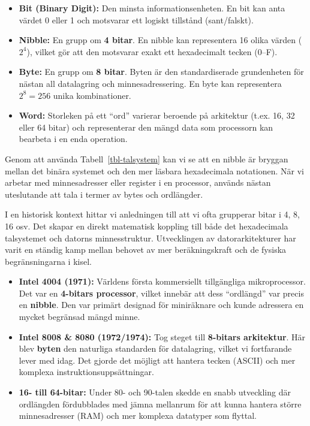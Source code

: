 \documentclass[
  swedish,
  letterpaper,
  oneside,
  openany]{book}
\providecommand{\tightlist}{%
  \setlength{\itemsep}{0pt}\setlength{\parskip}{0pt}}
\begin{document}
\begin{itemize}
\tightlist
\item
  \textbf{Bit (Binary Digit):} Den minsta informationsenheten. En bit
  kan anta värdet 0 eller 1 och motsvarar ett logiskt tillstånd
  (sant/falskt).
\item
  \textbf{Nibble:} En grupp om \textbf{4 bitar}. En nibble kan
  representera 16 olika värden (\(2^4\)), vilket gör att den motsvarar
  exakt ett hexadecimalt tecken (0--F).
\item
  \textbf{Byte:} En grupp om \textbf{8 bitar}. Byten är den
  standardiserade grundenheten för nästan all datalagring och
  minnesadressering. En byte kan representera \(2^8 = 256\) unika
  kombinationer.
\item
  \textbf{Word:} Storleken på ett ``ord'' varierar beroende på
  arkitektur (t.ex. 16, 32 eller 64 bitar) och representerar den mängd
  data som processorn kan bearbeta i en enda operation.
\end{itemize}

Genom att använda Tabell~\ref{tbl-talsystem} kan vi se att en nibble är
bryggan mellan det binära systemet och den mer läsbara hexadecimala
notationen. När vi arbetar med minnesadresser eller register i en
processor, används nästan uteslutande att tala i termer av bytes och
ordlängder.

I en historisk kontext hittar vi anledningen till att vi ofta grupperar
bitar i 4, 8, 16 osv. Det skapar en direkt matematisk koppling till både
det hexadecimala talsystemet och datorns minnesstruktur. Utvecklingen av
datorarkitekturer har varit en ständig kamp mellan behovet av mer
beräkningskraft och de fysiska begränsningarna i kisel.

\begin{itemize}
\tightlist
\item
  \textbf{Intel 4004 (1971):} Världens första kommersiellt tillgängliga
  mikroprocessor. Det var en \textbf{4-bitars processor}, vilket innebär
  att dess ``ordlängd'' var precis en \textbf{nibble}. Den var primärt
  designad för miniräknare och kunde adressera en mycket begränsad mängd
  minne.
\item
  \textbf{Intel 8008 \& 8080 (1972/1974):} Tog steget till
  \textbf{8-bitars arkitektur}. Här blev \textbf{byten} den naturliga
  standarden för datalagring, vilket vi fortfarande lever med idag. Det
  gjorde det möjligt att hantera tecken (ASCII) och mer komplexa
  instruktionsuppsättningar.
\item
  \textbf{16- till 64-bitar:} Under 80- och 90-talen skedde en snabb
  utveckling där ordlängden fördubblades med jämna mellanrum för att
  kunna hantera större minnesadresser (RAM) och mer komplexa datatyper
  som flyttal.
\end{itemize}
\end{document}
